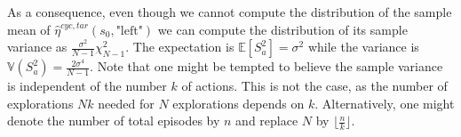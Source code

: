 \documentclass{article}
\newcommand{\E}{\mathbb{E}}
\theoremstyle{plain}
\newtheorem{proposition}[theorem]{Proposition}
\theoremstyle{definition}
\theoremstyle{remark}
\begin{document}
As a consequence, even though we cannot compute the distribution of the sample mean of $\hat\eta^{cyc, tar}(s_0,\text{"left"})$ we can compute the distribution of its sample variance as $\frac{\sigma^2}{N-1}\chi^2_{N-1}$. The expectation is $\E[S_a^2]=\sigma^2$ while the variance is $\mathbb V(S_a^2)=\frac{2\sigma^4}{N-1}$. Note that one might be tempted to believe the sample variance is independent of the number $k$ of actions. This is not the case, as the number of explorations $Nk$ needed for $N$ explorations depends on $k$. Alternatively, one might denote the number of total episodes by $n$ and replace $N$ by $\lfloor\frac{n}{k}\rfloor$.


%
%
%



    
\end{document}
